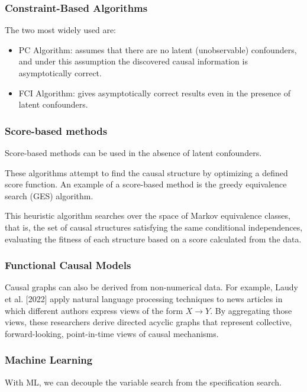 \documentclass{article}
\begin{document}
\subsubsection{Constraint-Based Algorithms}
The two most widely used are:

\begin{itemize}
  \item PC Algorithm: assumes that there are no latent (unobservable) confounders, and under this assumption the discovered causal information is asymptotically correct.
  \item FCI Algorithm: gives asymptotically correct results even in the presence of latent confounders.
\end{itemize}

\subsubsection{Score-based methods}
Score-based methods can be used in the absence of latent confounders. 

These algorithms attempt to find the causal structure by optimizing a defined score function. An example of a score-based method is the greedy equivalence search (GES) algorithm.

This heuristic algorithm searches over the space of Markov equivalence classes, that is, the set of causal structures satisfying the same conditional independences, evaluating the fitness of each structure based on a score calculated from the data.

\subsubsection{Functional Causal Models}

Causal graphs can also be derived from non-numerical data. For example, Laudy et al. [2022]
apply natural language processing techniques to news articles in which different authors express
views of the form $X \to Y$. By aggregating those views, these researchers derive directed acyclic
graphs that represent collective, forward-looking, point-in-time views of causal mechanisms.

\subsubsection{Machine Learning}

With ML, we can decouple the variable search from the specification search.
\end{document}
